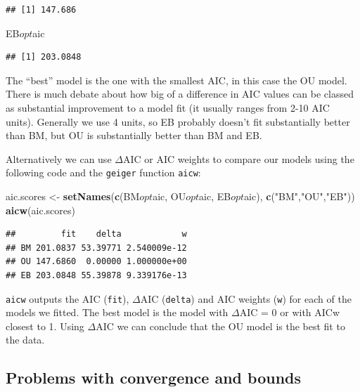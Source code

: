 \documentclass[]{book}
\newenvironment{Shaded}{\begin{snugshade}}{\end{snugshade}}
\newcommand{\KeywordTok}[1]{\textcolor[rgb]{0.13,0.29,0.53}{\textbf{{#1}}}}
\newcommand{\StringTok}[1]{\textcolor[rgb]{0.31,0.60,0.02}{{#1}}}
\newcommand{\NormalTok}[1]{{#1}}
\begin{document}
\begin{verbatim}
## [1] 147.686
\end{verbatim}

\begin{Shaded}
\begin{Highlighting}[]
\NormalTok{EB$opt$aic}
\end{Highlighting}
\end{Shaded}

\begin{verbatim}
## [1] 203.0848
\end{verbatim}

The ``best'' model is the one with the smallest AIC, in this case the OU
model. There is much debate about how big of a difference in AIC values
can be classed as substantial improvement to a model fit (it usually
ranges from 2-10 AIC units). Generally we use 4 units, so EB probably
doesn't fit substantially better than BM, but OU is substantially better
than BM and EB.

Alternatively we can use \(\Delta\)AIC or AIC weights to compare our
models using the following code and the \texttt{geiger} function
\texttt{aicw}:

\begin{Shaded}
\begin{Highlighting}[]
\NormalTok{aic.scores <-}\StringTok{ }\KeywordTok{setNames}\NormalTok{(}\KeywordTok{c}\NormalTok{(BM$opt$aic, OU$opt$aic, EB$opt$aic), }\KeywordTok{c}\NormalTok{(}\StringTok{"BM"}\NormalTok{,}\StringTok{"OU"}\NormalTok{,}\StringTok{"EB"}\NormalTok{))}
\KeywordTok{aicw}\NormalTok{(aic.scores)}
\end{Highlighting}
\end{Shaded}

\begin{verbatim}
##         fit    delta            w
## BM 201.0837 53.39771 2.540009e-12
## OU 147.6860  0.00000 1.000000e+00
## EB 203.0848 55.39878 9.339176e-13
\end{verbatim}

\texttt{aicw} outputs the AIC (\texttt{fit}), \(\Delta\)AIC
(\texttt{delta}) and AIC weights (\texttt{w}) for each of the models we
fitted. The best model is the model with \(\Delta\)AIC = 0 or with AICw
closest to 1. Using \(\Delta\)AIC we can conclude that the OU model is
the best fit to the data.

\subsection{Problems with convergence and
bounds}\label{problems-with-convergence-and-bounds}
\end{document}
